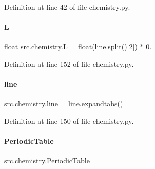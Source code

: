 Definition at line 42 of file chemistry.\+py.

\mbox{\label{namespacesrc_1_1chemistry_ab523d2adfa843021628d784c390fb46f}} 
\paragraph{\texorpdfstring{L}{L}}
{\footnotesize\ttfamily float src.\+chemistry.\+L = float(line.\+split()\mbox{[}2\mbox{]}) $\ast$ 0.}



Definition at line 152 of file chemistry.\+py.

\mbox{\label{namespacesrc_1_1chemistry_a03302cdcc2126738b5aa1dfdc0c8777d}} 
\paragraph{\texorpdfstring{line}{line}}
{\footnotesize\ttfamily src.\+chemistry.\+line = line.\+expandtabs()}



Definition at line 150 of file chemistry.\+py.

\mbox{\label{namespacesrc_1_1chemistry_a6e4691b3d86c5d03b20ddc39dff30bdb}} 
\paragraph{\texorpdfstring{Periodic\+Table}{PeriodicTable}}
{\footnotesize\ttfamily src.\+chemistry.\+Periodic\+Table}

